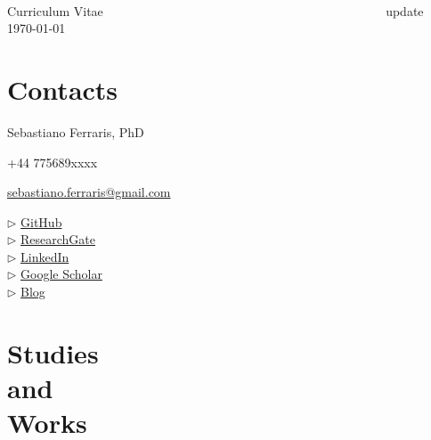\documentclass[margin,line]{resume}
\begin{document}
~
\vspace{-1cm}

{\sc \Large Curriculum Vitae ~~~~~~~~~~~~~~~~~~~~~~~~~~~~~~~~~~~~~~~~~~~~ \scriptsize update \today}
\begin{resume}
    
    
    \section{\mysidestyle Contacts}
    
    Sebastiano Ferraris, PhD
    
    +44 775689xxxx
    
    \href{mailto:sebastiano.ferraris@gmail.com}{sebastiano.ferraris@gmail.com}

    $\triangleright$ \href{http://www.github.com/SebastianoF}{GitHub}\\
    $\triangleright$ \href{https://www.researchgate.net/profile/Sebastiano_Ferraris}{ResearchGate}\\
    $\triangleright$ \href{https://www.linkedin.com/in/ibis-redibis/}{LinkedIn}\\
    $\triangleright$ \href{https://scholar.google.com/citations?user=1tAeAI0AAAAJ&hl=en}{Google Scholar}\\
    $\triangleright$ \href{https://sebastianof.github.io/GeoDsBlog/}{Blog}


\section{\mysidestyle Studies \\ and \\ Works}



\end{resume}
\end{document}
